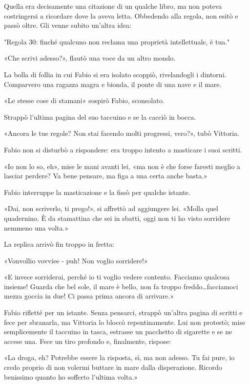 Quella era decisamente una citazione di un qualche libro, ma non poteva costringersi a ricordare dove la aveva letta. Obbedendo alla regola, non esitò e passò oltre. Gli venne subito un'altra idea:

"Regola 30: finché qualcuno non reclama una proprietà intellettuale, è tua."

«Che scrivi adesso?», flautò una voce da un altro mondo.

La bolla di follia in cui Fabio si era isolato scoppiò, rivelandogli i dintorni. Comparvero una ragazza magra e bionda, il ponte di una nave e il mare.

«Le stesse cose di stamani» sospirò Fabio, sconsolato.

Strappò l'ultima pagina del suo taccuino e se la cacciò in bocca.

«Ancora le tue regole? Non stai facendo molti progressi, vero?», tubò Vittoria.

Fabio non si disturbò a rispondere: era troppo intento a masticare i suoi scritti.

«Io non lo so, eh», mise le mani avanti lei, «ma non è che forse faresti meglio a lasciar perdere? Va bene pensare, ma figa a una certa anche basta.»

Fabio interruppe la masticazione e la fissò per qualche istante.

«Dai, non scriverlo, ti prego!», si affrettò ad aggiungere lei. «Molla quel quadernino. È da stamattina che sei in sbatti, oggi non ti ho visto sorridere nemmeno una volta.»

La replica arrivò fin troppo in fretta:

«Vonvollio vovviee - puh! Non voglio sorridere!»

«E invece sorriderai, perché io ti voglio vedere contento. Facciamo qualcosa insieme! Guarda che bel sole, il mare è bello, non fa troppo freddo\ldots facciamoci mezza goccia in due! Ci passa prima ancora di arrivare.»

Fabio rifletté per un istante. Senza pensarci, strappò un'altra pagina di scritti e fece per sbranarla, ma Vittoria lo bloccò repentinamente. Lui non protestò; mise semplicemente il taccuino in tasca, estrasse un pacchetto di sigarette e se ne accese una. Fece un tiro profondo e, finalmente, rispose:

«La droga, eh? Potrebbe essere la risposta, sì, ma non adesso. Tu fai pure, io credo proprio di non volermi buttare in mare dalla disperazione. Ricordo benissimo quanto ho sofferto l'ultima volta.»

